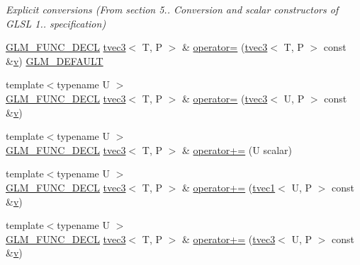\begin{DoxyCompactItemize}
\begin{DoxyCompactList}\small\item\em Explicit conversions (From section 5.. Conversion and scalar constructors of G\+L\+SL 1.. specification) \end{DoxyCompactList}\item 
\mbox{\hyperlink{setup_8hpp_ab2d052de21a70539923e9bcbf6e83a51}{G\+L\+M\+\_\+\+F\+U\+N\+C\+\_\+\+D\+E\+CL}} \mbox{\hyperlink{structglm_1_1tvec3}{tvec3}}$<$ T, P $>$ \& \mbox{\hyperlink{structglm_1_1tvec3_ad790b1fabd3d2c5e77324f6812be2e1b}{operator=}} (\mbox{\hyperlink{structglm_1_1tvec3}{tvec3}}$<$ T, P $>$ const \&\mbox{\hyperlink{glad_8h_a14cfbe2fc2234f5504618905b69d1e06}{v}}) \mbox{\hyperlink{setup_8hpp_aefce7051c376a64ba89fa93a9f63bc2c}{G\+L\+M\+\_\+\+D\+E\+F\+A\+U\+LT}}
\item 
{\footnotesize template$<$typename U $>$ }\\\mbox{\hyperlink{setup_8hpp_ab2d052de21a70539923e9bcbf6e83a51}{G\+L\+M\+\_\+\+F\+U\+N\+C\+\_\+\+D\+E\+CL}} \mbox{\hyperlink{structglm_1_1tvec3}{tvec3}}$<$ T, P $>$ \& \mbox{\hyperlink{structglm_1_1tvec3_aff4967c521c4bc8f009eed5db29c9406}{operator=}} (\mbox{\hyperlink{structglm_1_1tvec3}{tvec3}}$<$ U, P $>$ const \&\mbox{\hyperlink{glad_8h_a14cfbe2fc2234f5504618905b69d1e06}{v}})
\item 
{\footnotesize template$<$typename U $>$ }\\\mbox{\hyperlink{setup_8hpp_ab2d052de21a70539923e9bcbf6e83a51}{G\+L\+M\+\_\+\+F\+U\+N\+C\+\_\+\+D\+E\+CL}} \mbox{\hyperlink{structglm_1_1tvec3}{tvec3}}$<$ T, P $>$ \& \mbox{\hyperlink{structglm_1_1tvec3_af22cc44c2405f4db35bc67994a5b0c50}{operator+=}} (U scalar)
\item 
{\footnotesize template$<$typename U $>$ }\\\mbox{\hyperlink{setup_8hpp_ab2d052de21a70539923e9bcbf6e83a51}{G\+L\+M\+\_\+\+F\+U\+N\+C\+\_\+\+D\+E\+CL}} \mbox{\hyperlink{structglm_1_1tvec3}{tvec3}}$<$ T, P $>$ \& \mbox{\hyperlink{structglm_1_1tvec3_acfd1571d1fab5431b44fdad4d63f3134}{operator+=}} (\mbox{\hyperlink{structglm_1_1tvec1}{tvec1}}$<$ U, P $>$ const \&\mbox{\hyperlink{glad_8h_a14cfbe2fc2234f5504618905b69d1e06}{v}})
\item 
{\footnotesize template$<$typename U $>$ }\\\mbox{\hyperlink{setup_8hpp_ab2d052de21a70539923e9bcbf6e83a51}{G\+L\+M\+\_\+\+F\+U\+N\+C\+\_\+\+D\+E\+CL}} \mbox{\hyperlink{structglm_1_1tvec3}{tvec3}}$<$ T, P $>$ \& \mbox{\hyperlink{structglm_1_1tvec3_aca33e625fbb5231fe04a31a3f6ac7d9c}{operator+=}} (\mbox{\hyperlink{structglm_1_1tvec3}{tvec3}}$<$ U, P $>$ const \&\mbox{\hyperlink{glad_8h_a14cfbe2fc2234f5504618905b69d1e06}{v}})

\end{DoxyCompactItemize}
